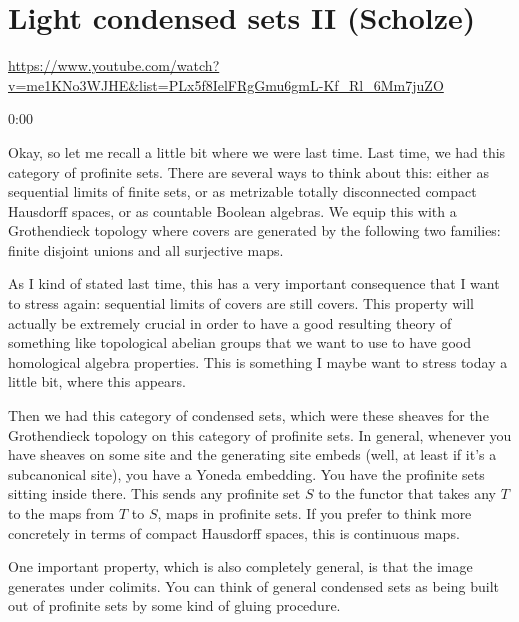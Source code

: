 
\section{\ufs Light condensed sets II (Scholze)}

\url{https://www.youtube.com/watch?v=me1KNo3WJHE&list=PLx5f8IelFRgGmu6gmL-Kf_Rl_6Mm7juZO}
\renewcommand{\yt}[2]{\href{https://www.youtube.com/watch?v=me1KNo3WJHE&list=PLx5f8IelFRgGmu6gmL-Kf_Rl_6Mm7juZO&t=#1}{#2}}
\vspace{1em}

\begin{unfinished}{0:00}

Okay, so let me recall a little bit where we were last time. Last time, we had this category of profinite sets. There are several ways to think about this: either as sequential limits of finite sets, or as metrizable totally disconnected compact Hausdorff spaces, or as countable Boolean algebras. We equip this with a Grothendieck topology where covers are generated by the following two families: finite disjoint unions and all surjective maps.

As I kind of stated last time, this has a very important consequence that I want to stress again: sequential limits of covers are still covers. This property will actually be extremely crucial in order to have a good resulting theory of something like topological abelian groups that we want to use to have good homological algebra properties. This is something I maybe want to stress today a little bit, where this appears.

Then we had this category of condensed sets, which were these sheaves for the Grothendieck topology on this category of profinite sets. In general, whenever you have sheaves on some site and the generating site embeds (well, at least if it's a subcanonical site), you have a Yoneda embedding. You have the profinite sets sitting inside there. This sends any profinite set $S$ to the functor that takes any $T$ to the maps from $T$ to $S$, maps in profinite sets. If you prefer to think more concretely in terms of compact Hausdorff spaces, this is continuous maps.

One important property, which is also completely general, is that the image generates under colimits. You can think of general condensed sets as being built out of profinite sets by some kind of gluing procedure.


\end{unfinished}
